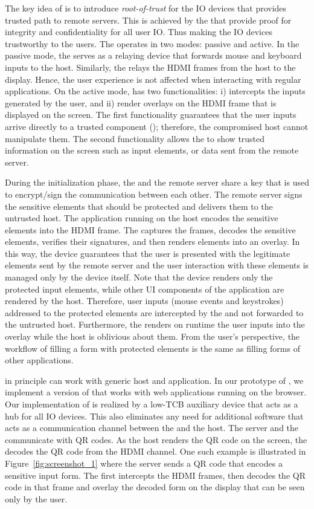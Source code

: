  The key idea of \name is to introduce \emph{root-of-trust} for the IO devices that provides trusted path to remote servers. This is achieved by the \device that provide proof for integrity and confidentiality for all user IO. Thus making the IO devices trustworthy to the users. The \device operates in two modes: passive and active. In the passive mode, the \device serves as a relaying device that forwards mouse and keyboard inputs to the host. Similarly, the \device relays the HDMI frames from the host to the display. Hence, the user experience is not affected when interacting with regular applications. On the active mode, \device has two functionalities: i) intercepts the inputs generated by the user, and ii) render overlays on the HDMI frame that is displayed on the screen. 
The first functionality guarantees that the user inputs arrive directly to a trusted component (\device); therefore, the compromised host cannot manipulate them. The second functionality allows the \device to show trusted information on the screen such as input elements, or data sent from the remote server.

During the initialization phase, the \device and the remote server share a key that is used to encrypt/sign the communication between each other. The remote server signs the sensitive elements that should be protected and delivers them to the untrusted host. The application running on the host encodes the sensitive elements into the HDMI frame. The \device captures the frames, decodes the sensitive elements, verifies their signatures, and then renders elements into an overlay. In this way, the device guarantees that the user is presented with the legitimate elements sent by the remote server and the user interaction with these elements is managed only by the device itself. Note that the device renders only the protected input elements, while other UI components of the application are rendered by the host. 
Therefore, user inputs (mouse events and keystrokes) addressed to the protected elements are intercepted by the \device and not forwarded to the untrusted host. Furthermore, the \device renders on runtime the user inputs into the overlay while the host is oblivious about them. From the user's perspective, the workflow of filling a form with protected elements is the same as filling forms of other applications.

 \name in principle can work with generic host and application. In our prototype of \name, we implement a version of \name that works with web applications running on the browser. Our implementation of \name is realized by a low-TCB auxiliary device that acts as a hub for all IO devices. This also eliminates any need for additional software that acts as a communication channel between the \device and the host. The server and the \device communicate with QR codes. As the host renders the QR code on the screen, the \device decodes the QR code from the HDMI channel. One such example is illustrated in Figure~\ref{fig:screenshot_1} where the server sends a QR code that encodes a sensitive input form. The \device first intercepts the HDMI frames, then decodes the QR code in that frame and overlay the decoded form on the display that can be seen only by the user. 

